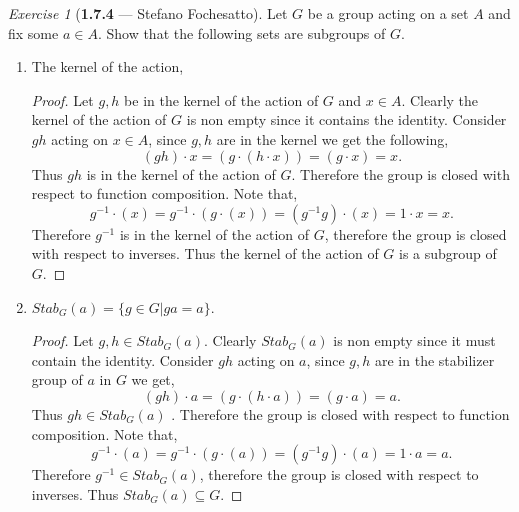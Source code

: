 \documentclass[12pt]{amsart}
\theoremstyle{remark}
\newtheorem*{exercise}{Exercise}%
\theoremstyle{mycomment}
\begin{document}
\begin{exercise}[\textbf{1.7.4} --- Stefano Fochesatto] Let $G$ be a group acting on a set $A$ and fix some $a \in A$. 
  Show that the following sets are subgroups of $G$. 
  \begin{enumerate}
    \item[a.] The kernel of the action, 
    \begin{proof} Let $g, h$ be in the kernel of the action of $G$ and $x \in A$.  Clearly the kernel of the action of $G$ is non empty since it contains the identity. 
      Consider $gh$ acting on $x \in A$, since 
      $g,h$ are in the kernel we get the following, 
      \begin{equation*}
        (gh)\cdot x = (g\cdot (h\cdot x)) = (g \cdot x) = x.
      \end{equation*} 
      Thus $gh$ is in the kernel of the action of $G$. Therefore the group is closed with respect to function composition. Note that,
      \begin{equation*}
        g^{-1}\cdot (x) = g^{-1}\cdot (g \cdot (x)) = (g^{-1}g) \cdot (x) = 1 \cdot x = x.
      \end{equation*}
      Therefore $g^{-1}$ is in the kernel of the action of $G$, therefore the group is closed with respect to inverses. Thus the 
      kernel of the action of $G$ is a subgroup of $G$. 
    \end{proof}
    \vspace{.15in}



    \item[b.] $ Stab_G(a) = \{g \in G | ga = a \}$. \\
    \begin{proof}Let $g, h \in Stab_G(a)$. Clearly $Stab_G(a)$ is non empty since it must contain the identity. Consider $gh$ acting on $a$, since 
      $g,h$ are in the stabilizer group of $a$ in $G$ we get, 
      \begin{equation*}
        (gh)\cdot a = (g\cdot (h\cdot a)) = (g \cdot a) = a.
      \end{equation*} 
      Thus $gh \in Stab_G(a)$ . Therefore the group is closed with respect to function composition. Note that,
      \begin{equation*}
        g^{-1}\cdot (a) = g^{-1}\cdot (g \cdot (a)) = (g^{-1}g) \cdot (a) = 1 \cdot a = a.
      \end{equation*}
      Therefore $g^{-1}\in Stab_G(a)$, therefore the group is closed with respect to inverses. Thus $Stab_G(a) \subseteq G$. 
      
    \end{proof}
  \end{enumerate}
\end{exercise}
\vspace{.15in}
\end{document}
